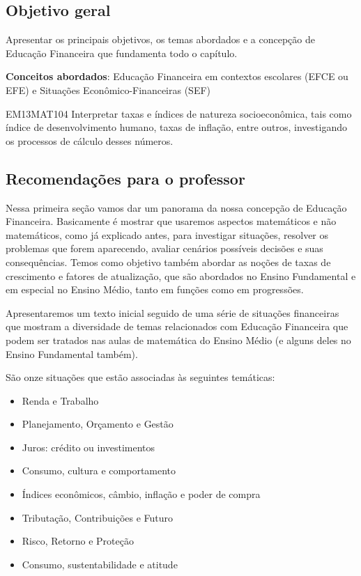 \def\currentcolor{session1}
\begin{texto}
{
  \subsection*{Objetivo geral}

  Apresentar os principais objetivos, os temas abordados e a concepção de Educação Financeira que fundamenta todo o capítulo.

  \textbf{Conceitos abordados}: Educação Financeira em contextos escolares (EFCE ou EFE) e Situações Econômico-Financeiras (SEF)

  \begin{habilities}{EM13MAT104}
  Interpretar taxas e índices de natureza socioeconômica, tais como índice de desenvolvimento humano, taxas de inflação, entre outros, investigando os processos de cálculo desses números.
  \end{habilities}

  \subsection{Recomendações para o professor}

  Nessa primeira seção vamos dar um panorama da nossa concepção de Educação Financeira. Basicamente é mostrar que usaremos aspectos matemáticos e não matemáticos, como já explicado antes, para investigar situações, resolver os problemas que forem aparecendo, avaliar cenários possíveis decisões e suas consequências. Temos como objetivo também abordar as noções de taxas de crescimento e fatores de atualização, que são abordados no Ensino Fundamental e em especial no Ensino Médio, tanto em funções como em progressões. 

  Apresentaremos um texto inicial seguido de uma série de situações financeiras que mostram a diversidade de temas relacionados com Educação Financeira que podem ser tratados nas aulas de matemática do Ensino Médio (e alguns deles no Ensino Fundamental também).

  São onze situações que estão associadas às seguintes temáticas:
  \begin{itemize}
  \item Renda e Trabalho
  \item Planejamento, Orçamento e Gestão
  \item Juros: crédito ou investimentos
  \item Consumo, cultura e comportamento
  \item Índices econômicos, câmbio, inflação e poder de compra
  \item Tributação, Contribuições e Futuro
  \item Risco, Retorno e Proteção
  \item Consumo, sustentabilidade e atitude
  \end{itemize}

}
\end{texto}
